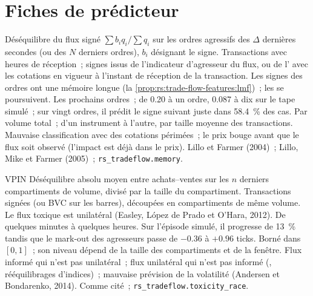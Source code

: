 \section{Fiches de prédicteur}

\begin{predictorcard}{Déséquilibre du flux signé}\label{pred:rs:trade-flow-features:signed}
 $\sum b_iq_i/\sum q_i$ sur les ordres agressifs des $\Delta$ dernières secondes (ou des $N$ derniers ordres), $b_i$ désignant le signe.
 Transactions avec heures de réception~; signes issus de l'indicateur d'agresseur du flux, ou de l' avec les cotations en vigueur à l'instant
de réception de la transaction.
 Les signes des ordres ont une mémoire longue (la \cref{prop:rs:trade-flow-features:lmf})~; les  se poursuivent.
 Les prochains ordres~;  de 0.20 à un ordre, 0.087 à dix sur le tape simulé~; sur vingt ordres, il prédit le signe suivant juste dans 58.4~\% des cas.
 Par volume total~; d'un instrument à l'autre, par taille moyenne des transactions.
 Mauvaise classification avec des cotations périmées~; le prix bouge avant que le flux soit observé (l'impact est déjà dans le prix).
 Lillo et Farmer (2004)~; Lillo, Mike et Farmer (2005)~; \texttt{rs\_tradeflow.memory}.
\end{predictorcard}

\begin{predictorcard}{VPIN}\label{pred:rs:trade-flow-features:vpin}
 Déséquilibre absolu moyen entre achats--ventes sur les $n$ derniers compartiments de volume, divisé par la taille du compartiment.
 Transactions signées (ou BVC sur les barres), découpées en compartiments de même volume.
 Le flux toxique est unilatéral (Easley, López de Prado et O'Hara, 2012).
 De quelques minutes à quelques heures. Sur l'épisode simulé, il progresse de 13~\% tandis que le mark-out des agresseurs passe de $-0.36$
à $+0.96$ ticks.
 Borné dans $[0, 1]$~; son niveau dépend de la taille des compartiments et de la fenêtre.
 Flux informé qui n'est pas unilatéral~; flux unilatéral qui n'est pas informé (, rééquilibrages d'indices)~; mauvaise
prévision de la volatilité (Andersen et Bondarenko, 2014).
 Comme cité~; \texttt{rs\_tradeflow.toxicity\_race}.
\end{predictorcard}

